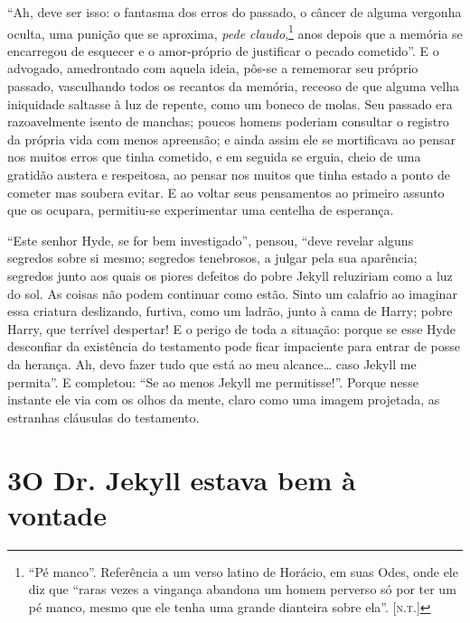 “Ah, deve ser isso: o fantasma dos erros do passado, o câncer de alguma
vergonha oculta, uma punição que se aproxima, \textit{pede claudo},\footnote{
“Pé manco”. Referência a um verso latino de Horácio, em suas Odes, onde
ele diz que “raras vezes a vingança abandona um homem perverso só por
ter um pé manco, mesmo que ele tenha uma grande dianteira sobre ela”. [\textsc{n.t.}]}
anos depois que a memória se encarregou de esquecer e o
amor-próprio de justificar o pecado cometido”.  E o advogado,
amedrontado com aquela ideia, pôs-se a rememorar seu próprio passado,
vasculhando todos os recantos da memória, receoso de que alguma velha
iniquidade saltasse à luz de repente, como um boneco de molas.  Seu
passado era razoavelmente isento de manchas; poucos homens poderiam
consultar o registro da própria vida com menos apreensão; e ainda assim
ele se mortificava ao pensar nos muitos erros que tinha cometido, e em
seguida se erguia, cheio de uma gratidão austera e respeitosa, ao
pensar nos muitos que tinha estado a ponto de cometer mas soubera
evitar.  E ao voltar seus pensamentos ao primeiro assunto que os
ocupara, permitiu-se experimentar uma centelha de esperança.

“Este senhor Hyde, se for bem investigado”, pensou, “deve revelar alguns
segredos sobre si mesmo; segredos tenebrosos, a julgar pela sua
aparência; segredos junto aos quais os piores defeitos do pobre Jekyll
reluziriam como a luz do sol.  As coisas não podem continuar como
estão. Sinto um calafrio ao imaginar essa criatura deslizando, furtiva,
como um ladrão, junto à cama de Harry; pobre Harry, que terrível
despertar! E o perigo de toda a situação: porque se esse Hyde
desconfiar da existência do testamento pode ficar impaciente para
entrar de posse da herança.  Ah, devo fazer tudo que está ao meu
alcance\ldots{} caso Jekyll me permita”.  E completou: “Se ao menos Jekyll
me permitisse!”.  Porque nesse instante ele via com os olhos da mente,
claro como uma imagem projetada, as estranhas cláusulas do testamento.


\chapter[3 -- O Dr. Jekyll estava bem à vontade]{3\break O Dr. Jekyll estava bem à vontade}

